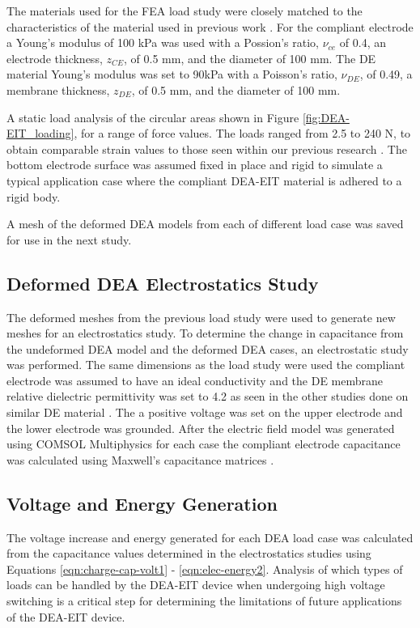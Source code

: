 The materials used for the FEA load study were closely matched to the characteristics of the material used in previous work \cite{Ellingham2024} . For the compliant electrode a Young's modulus of 100 kPa was used with a Possion's ratio, $\nu_{ce}$ of 0.4, an electrode thickness, $z_{CE}$, of 0.5 mm, and the diameter of 100 mm. The DE material Young's modulus was set to 90kPa with a Poisson's ratio, $\nu_{DE}$, of 0.49, a membrane thickness, $z_{DE}$, of 0.5 mm, and the diameter of 100 mm. 

A static load analysis of the circular areas shown in Figure \ref{fig:DEA-EIT_loading}, for a range of force values. The loads ranged from 2.5 to 240 N, to obtain comparable strain values to those seen within our previous research \cite{Ellingham2021,Ellingham2024} . The bottom electrode surface was assumed fixed in place and rigid to simulate a typical application case where the compliant DEA-EIT material is adhered to a rigid body.

A mesh of the deformed DEA models from each of different load case was saved for use in the next study.


\subsection{Deformed DEA Electrostatics Study}
The deformed meshes from the previous load study were used to generate new meshes for an electrostatics study. To determine the change in capacitance from the undeformed DEA model and the deformed DEA cases, an electrostatic study was performed. The same dimensions as the load study were used the compliant electrode was assumed to have an ideal conductivity and the DE membrane relative dielectric permittivity was set to 4.2 as seen in the other studies done on similar DE material \cite{Pan2015}. The a positive voltage was set on the upper electrode and the lower electrode was grounded. After the electric field model was generated using COMSOL Multiphysics \cite{COMSOL2022} for each case the compliant electrode capacitance was calculated using Maxwell's capacitance matrices \cite{Smolic2021} . 


\subsection{Voltage and Energy Generation}
The voltage increase and energy generated for each DEA load case was calculated from the capacitance values determined in the electrostatics studies using Equations \ref{eqn:charge-cap-volt1} - \ref{eqn:elec-energy2}. Analysis of which types of loads can be handled by the DEA-EIT device when undergoing high voltage switching is a critical step for determining the limitations of future applications of the DEA-EIT device.



